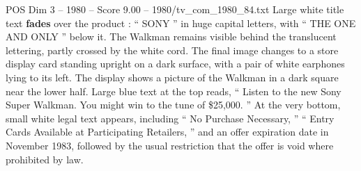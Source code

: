 \begin{textsample}{POS Dim 3 – 1980 – Score 9.00 – 1980/tv\_com\_1980\_84.txt}
Large white title text \textbf{fades} over the product : “ SONY ” in huge capital letters, with “ THE ONE AND ONLY ” below it.
The Walkman remains visible behind the translucent lettering, partly crossed by the white cord.
The final image changes to a store display card standing upright on a dark surface, with a pair of white earphones lying to its left.
The display shows a picture of the Walkman in a dark square near the lower half.
Large blue text at the top reads, “ Listen to the new Sony Super Walkman.
You might win to the tune of \$25,000. ” At the very bottom, small white legal text appears, including “ No Purchase Necessary, ” “ Entry Cards Available at Participating Retailers, ” and an offer expiration date in November 1983, followed by the usual restriction that the offer is void where prohibited by law.

\end{textsample}
